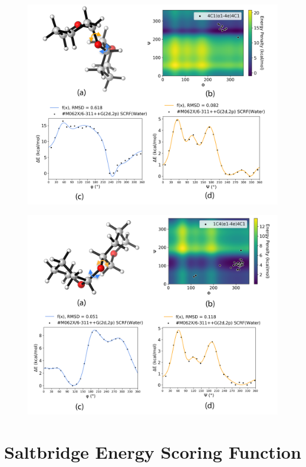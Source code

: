 \documentclass[a4paper, 12pt, openany]{book}
\begin{document}
\begin{figure}[h]
    \centering
    \includegraphics[width=14cm]{Figures/Torsions/Da1_4eD.png}
    \caption{}
    \label{fig:4c1_a_e_4c1}
\end{figure}

\begin{figure}[h]
    \centering
    \includegraphics[width=14cm]{Figures/Torsions/La1_4eD.png}
    \caption{}
    \label{fig:1c4_a_e_4c1}
\end{figure}


\section{Saltbridge Energy Scoring Function}
\end{document}
